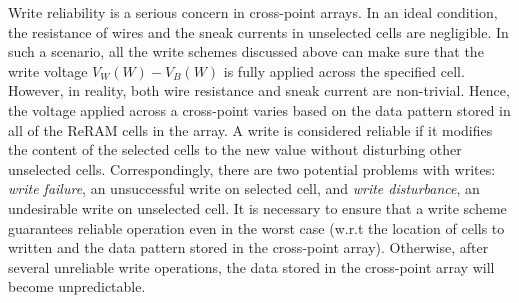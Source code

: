 Write reliability is a serious concern in cross-point arrays. In an ideal
condition, the resistance of wires and the sneak currents in unselected
cells are negligible. In such a scenario, all the write schemes discussed
above can make sure that the write voltage $V_W(W)-V_B(W)$ is fully
applied across the specified cell. However, in reality, both wire
resistance and sneak current are non-trivial. Hence, the voltage applied
across a cross-point varies based on the data pattern stored in all of the
ReRAM cells in the array. A write is considered reliable if it modifies
the content of the selected cells to the new value without disturbing
other unselected cells.
Correspondingly, there are two potential problems with writes: \emph{write
failure}, an unsuccessful write on selected cell, and \emph{write
disturbance}, an undesirable write on unselected cell. It is necessary to
ensure that a write scheme guarantees reliable operation even in the worst
case (w.r.t the location of cells to written and the data pattern stored
in the cross-point array). Otherwise, after several unreliable write
operations, the data stored in the cross-point array will become
unpredictable.

